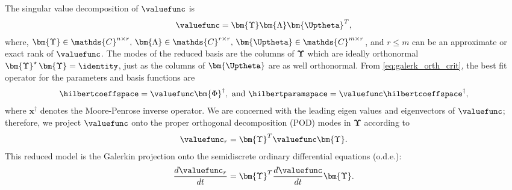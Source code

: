	The  singular value decomposition of $\valuefunc$ is 
%
\begin{align}
	\valuefunc = \bm{\Upsilon} \bm{\Lambda} \bm{\Uptheta}^T,
\end{align}
%
where, $\bm{\Upsilon} \in \mathds{C}^{n\times r}, \, \bm{\Lambda} \in \mathds{C}^{r\times r}, \, \bm{\Uptheta} \in \mathds{C}^{m\times r}$,
and $r\le m$ can be an approximate or exact rank of $\valuefunc$. The modes of the reduced basis are the columns of $\bm{\Upsilon}$ which are ideally orthonormal  \ie $\bm{\Upsilon}^\star\, \bm{\Upsilon} = \mathbf{\identity}$, just as the columns of $\bm{\Uptheta}$ are as well orthonormal. From \eqref{eq:galerk_orth_crit}, the best fit operator for the parameters and basis functions are %
%
\begin{align}
	\hilbertcoeffspace = \valuefunc \bm{\Phi}^\dagger, \text{ and } \hilbertparamspace = \valuefunc \hilbertcoeffspace^\dagger,
\end{align}
%
where $\bm{x}^\dagger$ denotes the Moore-Penrose inverse operator. We are concerned with the leading eigen values and eigenvectors of $\valuefunc$; therefore, we project $\valuefunc$ onto the proper orthogonal decomposition (POD) modes in $\bm{\Upsilon}$ according to 
%
\begin{align}
	\valuefunc_r = \bm{\Upsilon}^T \valuefunc \bm{\Upsilon}.
\end{align}
%
This reduced model is the Galerkin projection onto the semidiscrete ordinary differential equations (o.d.e.):
%
\begin{align}
	\dfrac{d \valuefunc_r}{dt} = \bm{\Upsilon}^T \dfrac{d \valuefunc}{dt} \bm{\Upsilon}.
\end{align}


